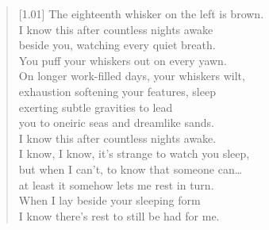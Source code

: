 \begin{verse}[1.01\textwidth]
The eighteenth whisker on the left is brown.\\
\vin I know this after countless nights awake\\
beside you, watching every quiet breath.\\
\vin You puff your whiskers out on every yawn.\\
On longer work-filled days, your whiskers wilt,\\
\vin exhaustion softening your features, sleep\\
exerting subtle gravities to lead\\
\vin you to oneiric seas and dreamlike sands.\\
I know this after countless nights awake.\\
\vin I know, I know, it's strange to watch you sleep,\\
but when I can't, to know that someone can\ldots{}\\
\vin at least it somehow lets me rest in turn.\\
When I lay beside your sleeping form\\
\vin I know there's rest to still be had for me.
\end{verse}
